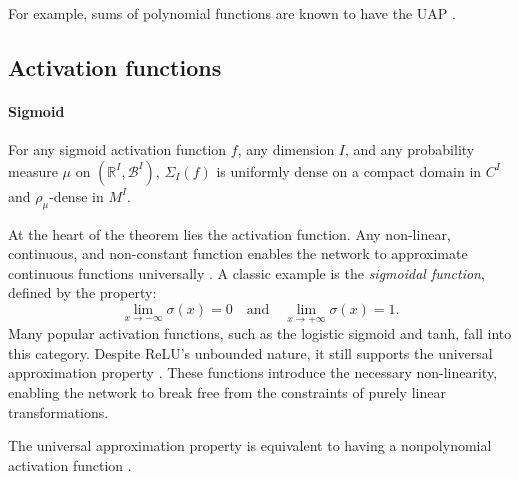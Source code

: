 \documentclass{article}
\newcounter{ct}
\begin{document}
For example, sums of polynomial functions are known to have the UAP  \citep{llavona1986approximation}.


\subsection{Activation functions} %
\paragraph{Sigmoid} %
\begin{theorem}
For any sigmoid activation function \( f \), any dimension \( I \), and any probability measure \( \mu \) on \( (\mathbb{R}^I, \mathcal{B}^I) \), \( \Sigma_I(f) \) is uniformly dense on a compact domain in \( C^I \) and \( \rho_{\mu} \)-dense in \( M^I \).
\end{theorem}



At the heart of the theorem lies the activation function.
Any non-linear, continuous, and non-constant function enables the network to approximate continuous functions universally \citep{csaji2001approximation}.
A classic example is the \textit{sigmoidal function}, defined by the property:
\[
\lim_{x \to -\infty} \sigma(x) = 0 \quad \text{and} \quad \lim_{x \to +\infty} \sigma(x) = 1.
\]
Many popular activation functions, such as the logistic sigmoid and tanh, fall into this category.
Despite ReLU's unbounded nature, it still supports the universal approximation property  \citep{yarotsky2017error}.
These functions introduce the necessary non-linearity, enabling the network to break free from the constraints of purely linear transformations.

The universal approximation property is equivalent to having a nonpolynomial activation function  \citep{pinkus1999approximation}.
\end{document}
